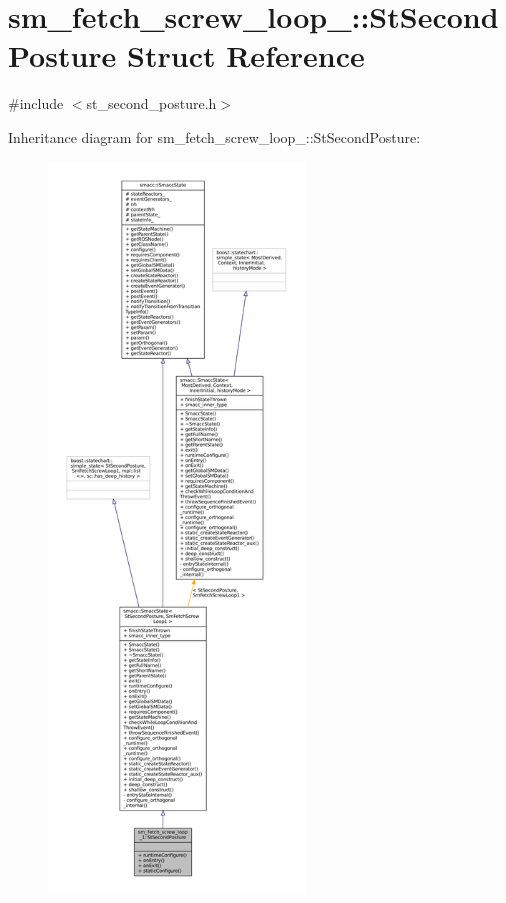\hypertarget{structsm__fetch__screw__loop__1_1_1StSecondPosture}{}\section{sm\+\_\+fetch\+\_\+screw\+\_\+loop\+\_\+:\+:St\+Second\+Posture Struct Reference}
\label{structsm__fetch__screw__loop__1_1_1StSecondPosture}


{\ttfamily \#include $<$st\+\_\+second\+\_\+posture.\+h$>$}



Inheritance diagram for sm\+\_\+fetch\+\_\+screw\+\_\+loop\+\_\+:\+:St\+Second\+Posture\+:
\nopagebreak
\begin{figure}[H]
\begin{center}
\leavevmode
\includegraphics[height=550pt]{structsm__fetch__screw__loop__1_1_1StSecondPosture__inherit__graph}
\end{center}
\end{figure}


